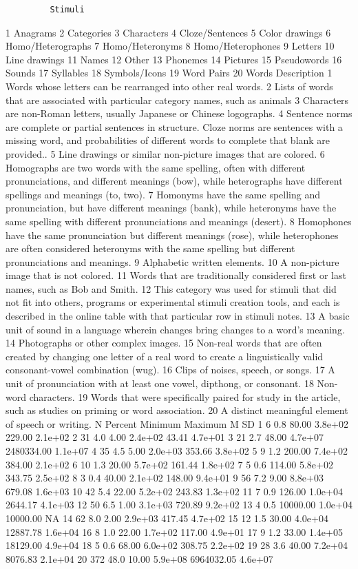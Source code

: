 \documentclass[english,man]{apa6}
\theoremstyle{definition}
\theoremstyle{definition}
\theoremstyle{definition}
\theoremstyle{remark}
\begin{document}
\begin{verbatim}
         Stimuli
\end{verbatim}

1 Anagrams 2 Categories 3 Characters 4 Cloze/Sentences 5 Color drawings
6 Homo/Heterographs 7 Homo/Heteronyms 8 Homo/Heterophones 9 Letters 10
Line drawings 11 Names 12 Other 13 Phonemes 14 Pictures 15 Pseudowords
16 Sounds 17 Syllables 18 Symbols/Icons 19 Word Pairs 20 Words
Description 1 Words whose letters can be rearranged into other real
words. 2 Lists of words that are associated with particular category
names, such as animals 3 Characters are non-Roman letters, usually
Japanese or Chinese logographs. 4 Sentence norms are complete or partial
sentences in structure. Cloze norms are sentences with a missing word,
and probabilities of different words to complete that blank are
provided.. 5 Line drawings or similar non-picture images that are
colored. 6 Homographs are two words with the same spelling, often with
different pronunciations, and different meanings (bow), while
heterographs have different spellings and meanings (to, two). 7 Homonyms
have the same spelling and pronunciation, but have different meanings
(bank), while heteronyms have the same spelling with different
pronunciations and meanings (desert). 8 Homophones have the same
pronunciation but different meanings (rose), while heterophones are
often considered heteronyms with the same spelling but different
pronunciations and meanings. 9 Alphabetic written elements. 10 A
non-picture image that is not colored. 11 Words that are traditionally
considered first or last names, such as Bob and Smith. 12 This category
was used for stimuli that did not fit into others, programs or
experimental stimuli creation tools, and each is described in the online
table with that particular row in stimuli notes. 13 A basic unit of
sound in a language wherein changes bring changes to a word's meaning.
14 Photographs or other complex images. 15 Non-real words that are often
created by changing one letter of a real word to create a linguistically
valid consonant-vowel combination (wug). 16 Clips of noises, speech, or
songs. 17 A unit of pronunciation with at least one vowel, dipthong, or
consonant. 18 Non-word characters. 19 Words that were specifically
paired for study in the article, such as studies on priming or word
association. 20 A distinct meaningful element of speech or writing. N
Percent Minimum Maximum M SD 1 6 0.8 80.00 3.8e+02 229.00 2.1e+02 2 31
4.0 4.00 2.4e+02 43.41 4.7e+01 3 21 2.7 48.00 4.7e+07 2480334.00 1.1e+07
4 35 4.5 5.00 2.0e+03 353.66 3.8e+02 5 9 1.2 200.00 7.4e+02 384.00
2.1e+02 6 10 1.3 20.00 5.7e+02 161.44 1.8e+02 7 5 0.6 114.00 5.8e+02
343.75 2.5e+02 8 3 0.4 40.00 2.1e+02 148.00 9.4e+01 9 56 7.2 9.00
8.8e+03 679.08 1.6e+03 10 42 5.4 22.00 5.2e+02 243.83 1.3e+02 11 7 0.9
126.00 1.0e+04 2644.17 4.1e+03 12 50 6.5 1.00 3.1e+03 720.89 9.2e+02 13
4 0.5 10000.00 1.0e+04 10000.00 NA 14 62 8.0 2.00 2.9e+03 417.45 4.7e+02
15 12 1.5 30.00 4.0e+04 12887.78 1.6e+04 16 8 1.0 22.00 1.7e+02 117.00
4.9e+01 17 9 1.2 33.00 1.4e+05 18129.00 4.9e+04 18 5 0.6 68.00 6.0e+02
308.75 2.2e+02 19 28 3.6 40.00 7.2e+04 8076.83 2.1e+04 20 372 48.0 10.00
5.9e+08 6964032.05 4.6e+07
\end{document}
